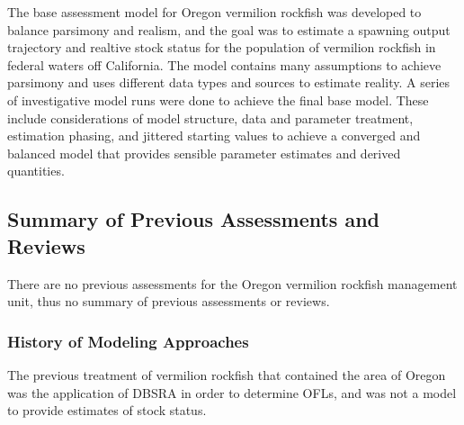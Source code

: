 \documentclass[11pt,
  english,
  a4paper,
]{article}
\begin{document}
\leavevmode\tagmcend\tagstructend


The base assessment model for Oregon vermilion rockfish was developed to balance parsimony and realism, and the goal was to estimate a spawning output trajectory and realtive stock status for the population of vermilion rockfish in federal waters off California. The model contains many assumptions to achieve parsimony and uses different data types and sources to estimate reality. A series of investigative model runs were done to achieve the final base model. These include considerations of model structure, data and parameter treatment, estimation phasing, and jittered starting values to achieve a converged and balanced model that provides sensible parameter estimates and derived quantities.

\leavevmode\tagmcend\tagstructend\par


\hypertarget{summary-of-previous-assessments-and-reviews}{%
\subsection{Summary of Previous Assessments and Reviews}\label{summary-of-previous-assessments-and-reviews}}

\leavevmode\tagmcend\tagstructend


There are no previous assessments for the Oregon vermilion rockfish management unit, thus no summary of previous assessments or reviews.

\leavevmode\tagmcend\tagstructend\par


\hypertarget{history-of-modeling-approaches}{%
\subsubsection{History of Modeling Approaches}\label{history-of-modeling-approaches}}

\leavevmode\tagmcend\tagstructend


The previous treatment of vermilion rockfish that contained the area of Oregon was the application of DBSRA in order to determine OFLs, and was not a model to provide estimates of stock status.
\end{document}
